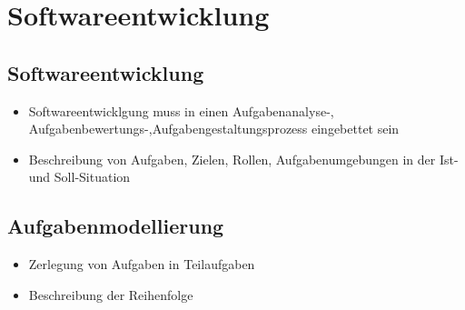 \documentclass[11pt, fleqn, a4paper, leqno]{scrartcl} %
\begin{document}
	\section{Softwareentwicklung}
		\subsection{Softwareentwicklung}
			\begin{itemize}
				\item Softwareentwicklgung muss in einen Aufgabenanalyse-, Aufgabenbewertungs-,Aufgabengestaltungsprozess eingebettet sein
				\item Beschreibung von Aufgaben, Zielen, Rollen, Aufgabenumgebungen in der Ist- und Soll-Situation
			\end{itemize}
		\subsection{Aufgabenmodellierung}
			\begin{itemize}
				\item Zerlegung von Aufgaben in Teilaufgaben
				\item Beschreibung der Reihenfolge
			\end{itemize}
\end{document}
